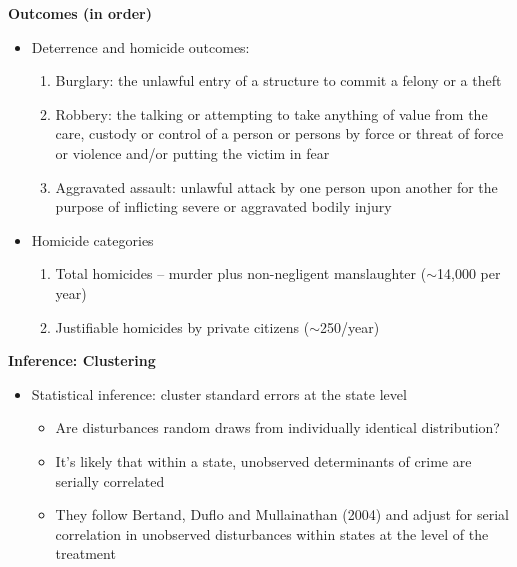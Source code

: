 \documentclass[notes=show]{beamer}
\begin{document}
\begin{frame}[plain]
\begin{center}
\textbf{Outcomes (in order)}
\end{center}

\begin{itemize}
	\item Deterrence and homicide outcomes:
		\begin{enumerate}
		\item Burglary: the unlawful entry of a structure to commit a felony or a theft
		\item Robbery: the talking or attempting to take anything of value from the care, custody or control of a person or persons by force or threat of force or violence and/or putting the victim in fear
		\item Aggravated assault: unlawful attack by one person upon another for the purpose of inflicting severe or aggravated bodily injury
		\end{enumerate}
	\item Homicide categories
		\begin{enumerate}
		\item Total homicides -- murder plus non-negligent manslaughter ($\sim$14,000 per year)
		\item  Justifiable homicides by private citizens ($\sim$250/year)
		\end{enumerate}
\end{itemize}

\end{frame}

\begin{frame}[plain]
	\begin{center}
	\textbf{Inference: Clustering}
	\end{center}
	
	\begin{itemize}
	\item Statistical inference: cluster standard errors at the state level
		\begin{itemize}
		\item Are disturbances random draws from individually identical distribution? 
		\item It's likely that within a state, unobserved determinants of crime are serially correlated
		\item They follow Bertand, Duflo and Mullainathan (2004) and adjust for serial correlation in unobserved disturbances within states at the level of the treatment 
		\end{itemize}
	\end{itemize}
\end{frame}
\end{document}
